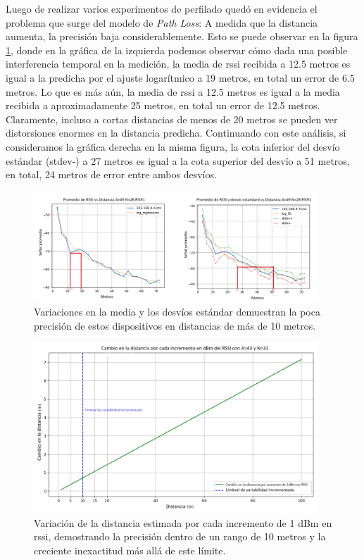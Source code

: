 Luego de realizar varios experimentos de perfilado quedó en evidencia el problema que surge del modelo de \textit{Path Loss}: A medida que la distancia aumenta, la precisión baja considerablemente. Esto se puede observar en la figura \ref{fig:distance-error-range}, donde en la gráfica de la izquierda podemos observar cómo dada una posible interferencia temporal en la medición, la media de \acs{rssi} recibida a 12.5 metros es igual a la predicha por el ajuste logarítmico a 19 metros, en total un error de 6.5 metros. Lo que es más aún, la media de \acs{rssi} a 12.5 metros es igual a la media recibida a aproximadamente 25 metros, en total un error de 12.5 metros. Claramente, incluso a cortas distancias de menos de 20 metros se pueden ver distorsiones enormes en la distancia predicha. Continuando con este análisis, si consideramos la gráfica derecha en la misma figura, la cota inferior del desvío estándar (stdev-) a 27 metros es igual a la cota superior del desvío a 51 metros, en total, 24 metros de error entre ambos desvíos.

\begin{figure}[!htb]
	\centering
	\includegraphics[width=0.95\textwidth]{Figuras/errores/4-raw-compilation-annotated.png}
	\captionsetup{margin=1cm}
	\caption[Variación de la distancia con \acs{rssi}]{Variaciones en la media y los desvíos estándar demuestran la poca precisión de estos dispositivos en distancias de más de 10 metros.}
	\label{fig:distance-error-range}
\end{figure}
\begin{figure}[!htb]
	\centering
	\includegraphics[width=0.95\textwidth]{Figuras/errores/distance_percentage_increase.png}
	\captionsetup{margin=1cm}
	\caption[Variación de la distancia con \acs{rssi}]{Variación de la distancia estimada por cada incremento de 1 dBm en \acs{rssi}, demostrando la precisión dentro de un rango de 10 metros y la creciente inexactitud más allá de este límite.}
	\label{fig:distance-percentage-increase}
\end{figure}

